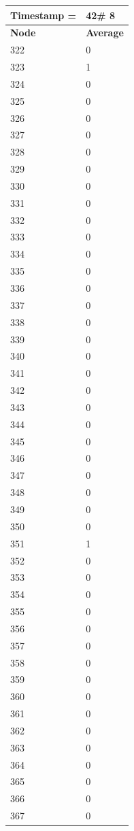 \begin{tabular}{|l||l|}
\hline
\textbf{Timestamp =} & \textbf{42}\# 8\\\hline
	\textbf{Node} & \textbf{Average} \\ \hline
\hline
	322 & 0 \\ \hline
	323 & 1 \\ \hline
	324 & 0 \\ \hline
	325 & 0 \\ \hline
	326 & 0 \\ \hline
	327 & 0 \\ \hline
	328 & 0 \\ \hline
	329 & 0 \\ \hline
	330 & 0 \\ \hline
	331 & 0 \\ \hline
	332 & 0 \\ \hline
	333 & 0 \\ \hline
	334 & 0 \\ \hline
	335 & 0 \\ \hline
	336 & 0 \\ \hline
	337 & 0 \\ \hline
	338 & 0 \\ \hline
	339 & 0 \\ \hline
	340 & 0 \\ \hline
	341 & 0 \\ \hline
	342 & 0 \\ \hline
	343 & 0 \\ \hline
	344 & 0 \\ \hline
	345 & 0 \\ \hline
	346 & 0 \\ \hline
	347 & 0 \\ \hline
	348 & 0 \\ \hline
	349 & 0 \\ \hline
	350 & 0 \\ \hline
	351 & 1 \\ \hline
	352 & 0 \\ \hline
	353 & 0 \\ \hline
	354 & 0 \\ \hline
	355 & 0 \\ \hline
	356 & 0 \\ \hline
	357 & 0 \\ \hline
	358 & 0 \\ \hline
	359 & 0 \\ \hline
	360 & 0 \\ \hline
	361 & 0 \\ \hline
	362 & 0 \\ \hline
	363 & 0 \\ \hline
	364 & 0 \\ \hline
	365 & 0 \\ \hline
	366 & 0 \\ \hline
	367 & 0 \\ \hline
\end{tabular}
